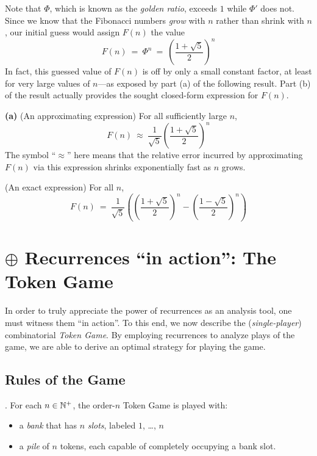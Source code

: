 \smallskip

\noindent
Note that $\Phi$, which is known as the \textit{golden ratio}, exceeds $1$ while $\Phi'$ does not.  Since we know that the Fibonacci numbers {\em grow} with $n$ rather than shrink with $n$, our initial guess would assign $F(n)$ the value
\[ F(n) \ = \ \Phi^n \ = \ {\displaystyle \left( \frac{1+\sqrt{5}}{2} \right)^n } \]
In fact, this guessed value of $F(n)$ is off by only a small constant factor, at least for very large values of $n$---as exposed by part (a) of the following result.  Part (b) of the result actually provides the sought closed-form expression for $F(n)$.

\begin{prop}
\label{thm:FibNo-GoldenRatio}
{\bf (a)} {\rm (An approximating expression)}
For all sufficiently large $n$,
\[ F(n) \ \approx \ \frac{1}{\sqrt{5}} \left(\frac{1+\sqrt{5}}{2} \right)^n \]
The symbol ``$\approx$'' here means that the relative error incurred by approximating $F(n)$ via this expression shrinks exponentially fast as $n$ grows.

\medskip

 {\rm (An exact expression)}
For all $n$,
\[ F(n) \ = \ 
\frac{1}{\sqrt{5}} \left( \left(\frac{1+\sqrt{5}}{2} \right)^n - \left(\frac{1-\sqrt{5}}{2} \right)^n \right)
\]
\end{prop}




\section{$\oplus$ Recurrences ``in action'': The Token Game}
\label{sec:TokenGame}

In order to truly appreciate the power of recurrences as an analysis tool, one must witness them ``in action''.  To this end, we now describe the ({\it single-player}) combinatorial {\it Token Game}.  By employing recurrences to analyze plays of the game, we are able to derive an optimal strategy for playing the game.

\subsection{Rules of the Game}
\label{sec:TokenGame-Rules}

.
For each $n \in \mathbb{N}^+$, the order-$n$ Token Game is played with:
\begin{itemize}
\item
a {\it bank} that has $n$ {\it slots}, labeled $1$, \ldots, $n$
\medskip\item
a {\it pile} of $n$ tokens, each capable of completely occupying a bank slot.
\end{itemize}

